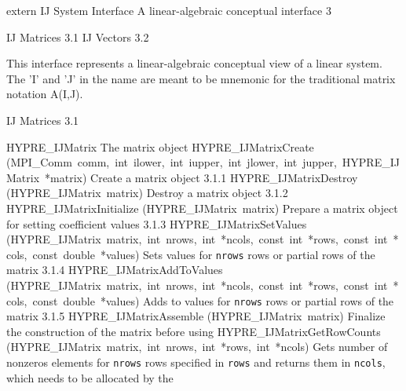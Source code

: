 \documentclass{article}
\begin{document}
\begin{cxxentry}
{extern }
        {IJ System Interface}
        {}
        {A linear-algebraic conceptual interface}
        {3}
\begin{cxxnames}
\cxxitem{}
        {IJ Matrices}
        {}
        {
}
        {3.1}
\cxxitem{}
        {IJ Vectors}
        {}
        {
}
        {3.2}
\end{cxxnames}
\begin{cxxdoc}


This interface represents a linear-algebraic conceptual view of a
linear system.  The 'I' and 'J' in the name are meant to be
mnemonic for the traditional matrix notation A(I,J).


\end{cxxdoc}
\begin{cxxentry}
{}
        {IJ Matrices}
        {}
        {
}
        {3.1}
\begin{cxxnames}
        {HYPRE\_IJMatrix}
        {}
        {
The matrix object}
        {}
\label{cxx.3.1.14}
        {HYPRE\_IJMatrixCreate}
        {(MPI\_Comm\ comm,\ int\ ilower,\ int\ iupper,\ int\ jlower,\ int\ jupper,\ HYPRE\_IJMatrix\ *matrix)}
        {
Create a matrix object}
        {3.1.1}
        {HYPRE\_IJMatrixDestroy}
        {(HYPRE\_IJMatrix\ matrix)}
        {
Destroy a matrix object}
        {3.1.2}
        {HYPRE\_IJMatrixInitialize}
        {(HYPRE\_IJMatrix\ matrix)}
        {
Prepare a matrix object for setting coefficient values}
        {3.1.3}
        {HYPRE\_IJMatrixSetValues}
        {(HYPRE\_IJMatrix\ matrix,\ int\ nrows,\ int\ *ncols,\ const\ int\ *rows,\ const\ int\ *cols,\ const\ double\ *values)}
        {
Sets values for {\tt nrows} rows or partial rows of the matrix}
        {3.1.4}
        {HYPRE\_IJMatrixAddToValues}
        {(HYPRE\_IJMatrix\ matrix,\ int\ nrows,\ int\ *ncols,\ const\ int\ *rows,\ const\ int\ *cols,\ const\ double\ *values)}
        {
Adds to values for {\tt nrows} rows or partial rows of the matrix}
        {3.1.5}
        {HYPRE\_IJMatrixAssemble}
        {(HYPRE\_IJMatrix\ matrix)}
        {
Finalize the construction of the matrix before using}
        {}
\label{cxx.3.1.15}
        {HYPRE\_IJMatrixGetRowCounts}
        {(HYPRE\_IJMatrix\ matrix,\ int\ nrows,\ int\ *rows,\ int\ *ncols)}
        {
Gets number of nonzeros elements for {\tt nrows} rows specified in {\tt rows}
and returns them in {\tt ncols}, which needs to be allocated by the
}
\end{cxxnames}
\end{cxxentry}
\end{cxxentry}
\end{document}

